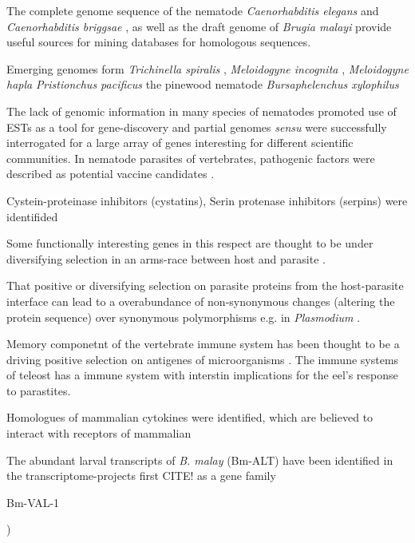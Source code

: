 The complete genome sequence of the nematode \textit{Caenorhabditis
  elegans} \cite{pmid9851916} and \textit{Caenorhabditis briggsae}
\cite{stein_genome_2003}, as well as the draft genome of
\textit{Brugia malayi} \cite{ghedin_draft_2007} provide useful sources
for mining databases for homologous sequences.

Emerging genomes form \textit{Trichinella spiralis}
\cite{pmid21336279}, \textit{Meloidogyne incognita}
\cite{pmid18660804}, \textit{Meloidogyne hapla} \cite{pmid18809916}
\textit{Pristionchus pacificus} the pinewood nematode
\textit{Bursaphelenchus xylophilus} \cite{pmid21909270} 

The lack of genomic information in many species of nematodes promoted
use of ESTs as a tool for gene-discovery and partial genomes
\textit{sensu} \cite{parkinson_partigene--constructing_2004} were
successfully interrogated for a large array of genes interesting for
different scientific communities. In nematode parasites of
vertebrates, pathogenic factors were described as potential vaccine
candidates \cite{pmid11406138}.

Cystein-proteinase inhibitors (cystatins), Serin protenase inhibitors
(serpins) were identifided 

Some functionally interesting genes in this respect are thought to be
under diversifying selection in an arms-race between host and parasite
\cite{zang_serine_2001}.

That positive or diversifying selection on parasite proteins from the
host-parasite interface can lead to a overabundance of non-synonymous
changes (altering the protein sequence) over synonymous polymorphisms
e.g. in \textit{Plasmodium} \cite{pmid7630387}.

Memory componetnt of the vertebrate immune system has been thought to
be a driving positive selection on antigenes of microorganisms
\cite{conway_measuring_2002}. The immune systems of teleost has a
immune system with interstin implications for the eel’s response to
parastites.

Homologues of mammalian cytokines were identified, which are believed
to interact with receptors of mammalian

The abundant larval transcripts of \textit{B. malay} (Bm-ALT) have
been identified in the transcriptome-projects first CITE! as a gene
family  \cite{gomez-escobar_abundant_2002}

Bm-VAL-1

\cite{blaxter_genes_1996, daub_survey_2000,
  parkinson_transcriptomic_2004, mitreva_gene_2004})

